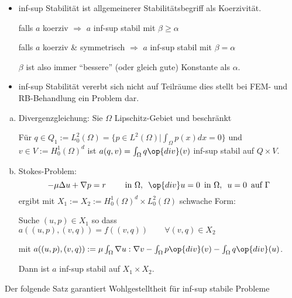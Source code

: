 \begin{bem} \beginwithlistbem
\begin{itemize}
	\item inf-sup Stabilität ist allgemeinerer Stabilitätsbegriff als Koerzivität.
	
	falls $a$ koerziv $\Rightarrow$ $a$ inf-sup stabil mit $\beta \geq \alpha$
	
	falls $a$ koerziv \& symmetrisch $\Rightarrow$ $a$ inf-sup stabil mit $\beta = \alpha$
	
	$\beta$ ist also immer ``bessere'' (oder gleich gute) Konstante als $\alpha$.
	\item inf-sup Stabilität vererbt sich nicht auf Teilräume dies stellt bei FEM- und RB-Behandlung ein Problem dar.
\end{itemize}
\end{bem}

\begin{bem}[Beispiel] \beginwithlistbem
\begin{enumerate}[a)]
\item Divergenzgleichung:  Sie $\Omega$ Lipschitz-Gebiet und beschränkt

Für $q \in Q_1 := L_0^2(\Omega) = \{p \in L^2 (\Omega) | \int_{\Omega} p(x) dx = 0 \}$ und $v \in V := H_0^1(\Omega)^d$ ist $a(q,v) = \int_{\Omega} q \op{div}(v)$ inf-sup stabil auf $Q \times V$.
\item Stokes-Problem:
\[
	-\mu \Delta u + \nabla p = r \qquad \text{ in } \Omega, \,\,\, \op{div} u=0 \, \text{ in } \Omega, \,\,\, u= 0 \, \text{ auf } \Gamma
\]
ergibt mit $X_1 := X_2 := H_0^1(\Omega)^d \times L_0^2(\Omega)$ schwache Form:

Suche $(u,p) \in X_1$ so dass $a((u,p),(v,q)) = f((v,q)) \qquad \forall (v,q) \in X_2$ 

mit $a((u,p),(v,q)) := \mu \int_{\Omega} \nabla u : \nabla v - \int_{\Omega} p \op{div}(v) - \int_{\Omega} q \op{div}(u)$.

Dann ist $a$ inf-sup stabil auf $X_1 \times X_2$.
\end{enumerate}
Der folgende Satz garantiert Wohlgestelltheit für inf-sup stabile Probleme
\end{bem}

